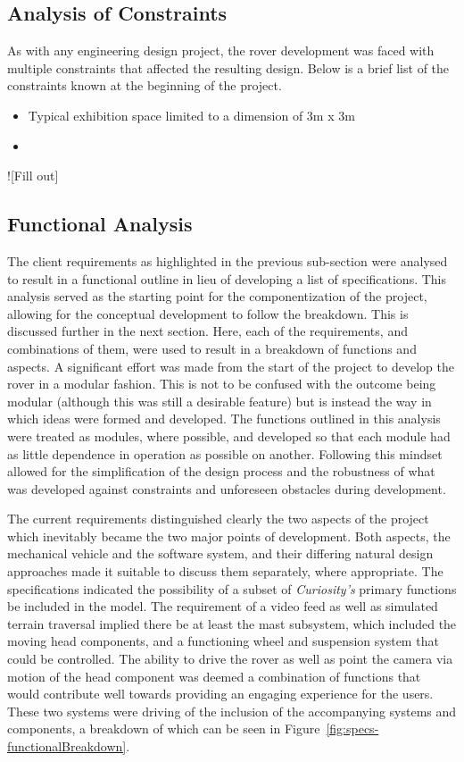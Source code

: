   \subsection{Analysis of Constraints}
    As with any engineering design project, the rover development was faced with multiple constraints that affected the resulting design. Below is a brief list of the constraints known at the beginning of the project.
    
    \begin{itemize}
      \item Typical exhibition space limited to a dimension of 3m x 3m
      \item 
    \end{itemize}
    
    ![Fill out]
    
  \subsection{Functional Analysis}
    The client requirements as highlighted in the previous sub-section were analysed to result in a functional outline in lieu of developing a list of specifications. This analysis served as the starting point for the componentization of the project, allowing for the conceptual development to follow the breakdown. This is discussed further in the next section. Here, each of the requirements, and combinations of them, were used to result in a breakdown of functions and aspects. A significant effort was made from the start of the project to develop the rover in a modular fashion. This is not to be confused with the outcome being modular (although this was still a desirable feature) but is instead the way in which ideas were formed and developed. The functions outlined in this analysis were treated as modules, where possible, and developed so that each module had as little dependence in operation as possible on another. Following this mindset allowed for the simplification of the design process and the robustness of what was developed against constraints and unforeseen obstacles during development.
    
    The current requirements distinguished clearly the two aspects of the project which inevitably became the two major points of development. Both aspects, the mechanical vehicle and the software system, and their differing natural design approaches made it suitable to discuss them separately, where appropriate. The specifications indicated the possibility of a subset of \textit{Curiosity's} primary functions be included in the model. The requirement of a video feed as well as simulated terrain traversal implied there be at least the mast subsystem, which included the moving head components, and a functioning wheel and suspension system that could be controlled. The ability to drive the rover as well as point the camera via motion of the head component was deemed a combination of functions that would contribute well towards providing an engaging experience for the users. These two systems were driving of the inclusion of the accompanying systems and components, a breakdown of which can be seen in Figure~\ref{fig:specs-functionalBreakdown}.
    
